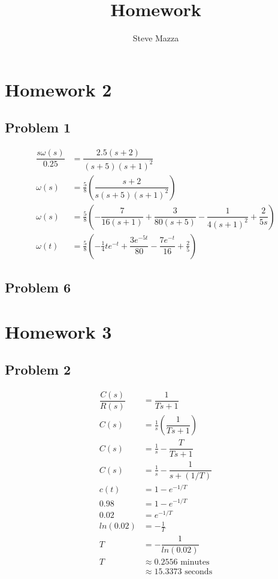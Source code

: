 \documentclass[letterpaper,10pt]{article}
\title{Homework}
\author{Steve Mazza}
\begin{document}
\maketitle

\section*{Homework 2}
\subsection*{Problem 1}
\begin{align*}
	\dfrac{s\omega(s)}{0.25} &= \dfrac{2.5(s+2)}{(s+5)(s+1)^2} \\
	\omega(s) &= \frac{5}{8}\left(\dfrac{s+2}{s(s+5)(s+1)^2}\right) \\
	\omega(s) &= \frac{5}{8}\left(-\dfrac{7}{16(s+1)} + \dfrac{3}{80(s+5)} - \dfrac{1}{4(s+1)^2}+ \dfrac{2}{5s}\right) \\
	\omega(t) &= \frac{5}{8}\left(-\frac{1}{4}te^{-t} + \dfrac{3e^{-5t}}{80} - \dfrac{7e^{-t}}{16} + \frac{2}{5}\right)
\end{align*}

\subsection*{Problem 6}

\section*{Homework 3}
\subsection*{Problem 2}
\begin{align*}
	\dfrac{C(s)}{R(s)} &= \dfrac{1}{Ts+1} \\
	C(s) &= \frac{1}{s}\left(\dfrac{1}{Ts+1}\right) \\
	C(s) &= \frac{1}{s} - \dfrac{T}{Ts+1} \\
	C(s) &= \frac{1}{s} - \dfrac{1}{s+(1/T)} \\
	c(t) &= 1 - e^{-1/T} \\
	0.98 &= 1 - e^{-1/T} \\
	0.02 &= e^{-1/T} \\
	ln(0.02) &= -\frac{1}{T} \\
	T &= -\dfrac{1}{ln(0.02)} \\
	T &\approx 0.2556 \mbox{\ minutes} \\
	&\approx 15.3373 \mbox{\ seconds}
\end{align*}
\end{document}
